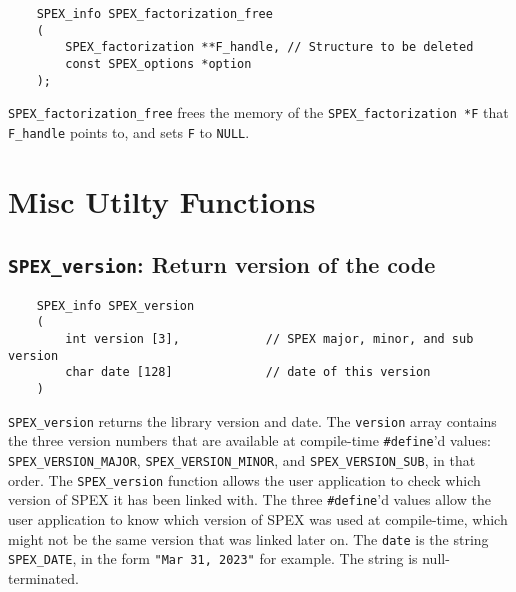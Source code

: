 \documentclass[12pt]{report}
\theoremstyle{definition}
\begin{document}
\newpage %
\begin{mdframed}[userdefinedwidth=6in]
{\footnotesize
\begin{verbatim}
    SPEX_info SPEX_factorization_free
    (
        SPEX_factorization **F_handle, // Structure to be deleted
        const SPEX_options *option
    ); 
\end{verbatim}
} \end{mdframed}

\verb|SPEX_factorization_free| frees the memory of the \verb|SPEX_factorization *F| that \verb|F_handle| points to, and sets \verb|F| to \verb|NULL|.

\section{Misc Utilty Functions}

\subsection{\texttt{SPEX\_version}: Return version of the code}

\begin{mdframed}[userdefinedwidth=6in]
{\footnotesize
\begin{verbatim}
    SPEX_info SPEX_version
    (
        int version [3],            // SPEX major, minor, and sub version
        char date [128]             // date of this version
    )
\end{verbatim}
} \end{mdframed}

\verb|SPEX_version| returns the library version and date.
The \verb'version' array contains the three version
numbers that are available at compile-time \verb'#define''d values:
\verb'SPEX_VERSION_MAJOR',
\verb'SPEX_VERSION_MINOR', and
\verb'SPEX_VERSION_SUB', in that order.  The \verb'SPEX_version' function
allows the user application to check which version of SPEX it has been
linked with.  The three \verb'#define''d values allow the user application
to know which version of SPEX was used at compile-time, which might not
be the same version that was linked later on.
The \verb'date' is the string \verb'SPEX_DATE', in the form
\verb'"Mar 31, 2023"' for example.  The string is null-terminated.


\end{document}
